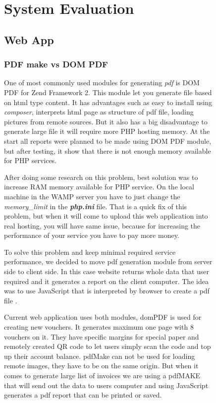 \begin{figure}



\chapter{System Evaluation}	%
\section{Web App}
	\subsection{PDF make vs DOM PDF}
		One of most commonly used modules for generating \textit{pdf} is DOM PDF for Zend Framework 2. This module let you generate file based on html type content. It has advantages such as easy to install using \textit{composer}, interprets html page as structure of pdf file, loading pictures from remote sources. But it also has a big disadvantage to generate large file it will require more PHP hosting memory. 
		At the start all reports were planned to be made using DOM PDF module, but after testing, it show that there is not enough memory available for PHP services. 
		
		After doing some research on this problem, best solution was to increase RAM memory available for PHP service. On the local machine in the WAMP server you have to just change the \textit{memory\_limit} in the \textit{\textbf{php.ini}} file. That is a quick fix of this problem, but when it will come to upload this web application into real hosting, you will have same issue, because for increasing the  performance of your service you have to pay more money.
		
		To solve this problem and keep minimal required service performance, we decided to move pdf generation module from server side to client side. In this case website returns whole data that user required and it generates a report on the client computer. The idea was to use JavaScript that is interpreted by browser to create a pdf file \cite{PDF_Make_module}.
		
		Current web application uses both modules, domPDF is used for creating new vouchers. It generates maximum one page with 8 vouchers on it. They have specific margins for special paper and remotely created QR code to let users simply scan the code and top up their account balance. pdfMake can not be used for loading remote images, they have to be on the same origin. But when it comes to generate large list of invoices we are using a pdfMAKE that will send out the data to users computer and using JavaScript generates a pdf report that can be printed or saved.
	

\end{figure}
